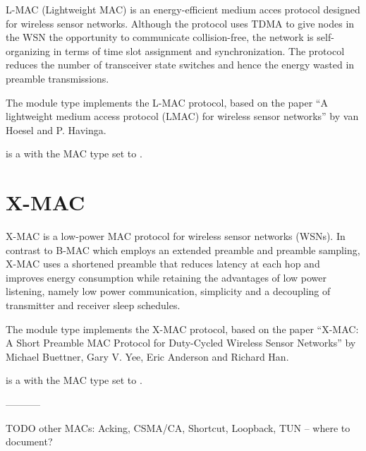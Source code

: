 L-MAC (Lightweight MAC) is an energy-efficient medium acces protocol designed 
for wireless sensor networks. Although the protocol uses TDMA to give nodes 
in the WSN the opportunity to communicate collision-free, the network is
self-organizing in terms of time slot assignment and synchronization. 
The protocol reduces the number of transceiver state switches and hence
the energy wasted in preamble transmissions.

The  module type implements the L-MAC protocol, based on the
paper ``A lightweight medium access protocol (LMAC) for wireless sensor networks''
by van Hoesel and P. Havinga.

 is a  with the MAC type
set to .


\section{X-MAC}
\label{sec:xmac}

X-MAC is a low-power MAC protocol for wireless sensor networks (WSNs).
In contrast to B-MAC which employs an extended preamble and preamble sampling,
X-MAC uses a shortened preamble that reduces latency at each hop and 
improves energy consumption while retaining the advantages 
of low power listening, namely low power communication, simplicity 
and a decoupling of transmitter and receiver sleep schedules.
 
The  module type implements the X-MAC protocol, based on
the paper ``X-MAC: A Short Preamble MAC Protocol for Duty-Cycled 
Wireless Sensor Networks'' by Michael Buettner, Gary V. Yee, Eric Anderson
and Richard Han.

 is a  with the MAC type
set to .


-----------

TODO other MACs: Acking, CSMA/CA, Shortcut, Loopback, TUN -- where to document?



